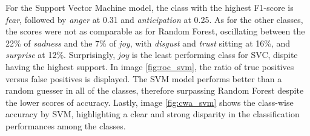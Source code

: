 

For the Support Vector Machine model, the class with the highest F1-score is \textit{fear}, followed by \textit{anger} at 0.31 and \textit{anticipation} at 0.25. 
As for the other classes, the scores were not as comparable as for Random Forest, oscillating between the 22\% of \textit{sadness} and the 7\% of \textit{joy}, with \textit{disgust} and \textit{trust} sitting at 16\%, and \textit{surprise} at 12\%. 
Surprisingly, \textit{joy} is the least performing class for SVC, dispite having the highest support.   
In image \ref{fig:roc_svm}, the ratio of true positives versus false positives is displayed. 
The SVM model performs better than a random guesser in all of the classes, therefore surpassing Random Forest despite the lower scores of accuracy. 
Lastly, image \ref{fig:cwa_svm} shows the class-wise accuracy by SVM, highlighting a clear and strong disparity in the classification performances among the classes.
